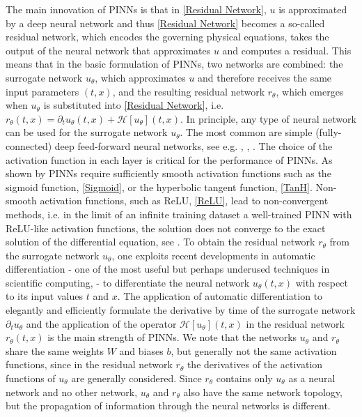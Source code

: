 The main innovation of PINNs is that in \cref{Residual Network}, $u$ is approximated by a deep neural network and thus \cref{Residual Network} becomes a so-called residual network, which encodes the governing physical equations, takes the output of the neural network that approximates $u$ and computes a residual. This means that in the basic formulation of PINNs, two networks are combined: the surrogate network $u_\theta$, which approximates $u$ and therefore receives the same input parameters $(t,x)$, and the resulting residual network $r_\theta$, which emerges when $u_\theta$ is substituted into \cref{Residual Network}, i.e. $r_\theta(t,x) = \partial_t u_\theta (t,x) + \mathcal{H} \left[ u_\theta \right] (t, x)$. In principle, any type of neural network can be used for the surrogate network $u_\theta$. The most common are simple (fully-connected) deep feed-forward neural networks, see e.g. \cite{RaissiPerdikarisKarniadakis:2019}, \cite{BlechschmidtErnst:2021}, \cite{Markidis:2021}. The choice of the activation function in each layer is critical for the performance of PINNs. As shown by \cite{MishraMolinaro:2021} PINNs require sufficiently smooth activation functions such as the sigmoid function, \cref{Sigmoid}, or the hyperbolic tangent function, \cref{TanH}. Non-smooth activation functions, such as ReLU, \cref{ReLU}, lead to non-convergent methods, i.e. in the limit of an infinite training dataset a well-trained PINN with ReLU-like activation functions, the solution does not converge to the exact solution of the differential equation, see \cite{MishraMolinaro:2021}. To obtain the residual network $r_\theta$ from the surrogate network $u_\theta$, one exploits recent developments in automatic differentiation - one of the most useful but perhaps underused techniques in scientific computing, \cite[p.~3]{RaissiPerdikarisKarniadakisPart1:2017} - to differentiate the neural network $u_\theta(t,x)$ with respect to its input values $t$ and $x$. The application of automatic differentiation to elegantly and efficiently formulate the derivative by time of the surrogate network $\partial_t u_\theta$ and the application of the operator $\mathcal{H} \left[ u_\theta \right] (t,x)$ in the residual network $r_\theta(t,x)$ is the main strength of PINNs. We note that the networks $u_\theta$ and $r_\theta$ share the same weights $W$ and biases $b$, but generally not the same activation functions, since in the residual network $r_\theta$ the derivatives of the activation functions of $u_\theta$ are generally considered. Since $r_\theta$ contains only $u_\theta$ as a neural network and no other network, $u_\theta$ and $r_\theta$ also have the same network topology, but the propagation of information through the neural networks is different. \\

